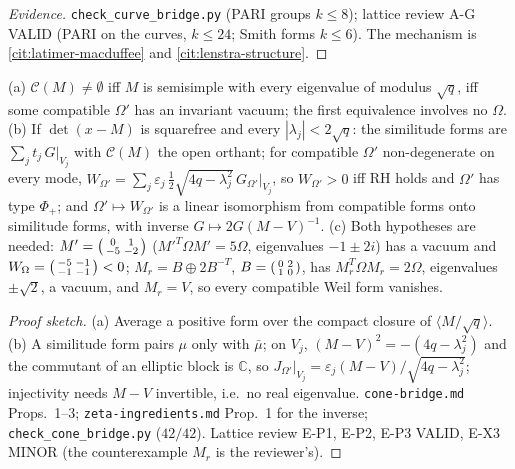 \begin{proof}[Evidence] \texttt{check\_curve\_bridge.py} (PARI groups $k\le8$); lattice review A-G VALID (PARI on the curves, $k\le24$; Smith forms $k\le6$). The mechanism is
\cref{cit:latimer-macduffee} and \cref{cit:lenstra-structure}.
\end{proof}
\begin{proposition}
\label{prop:gkp-vacuum-weil-form-cm-type} 
(a) $\mathcal C(M)\ne\emptyset$ iff $M$ is semisimple with every eigenvalue of modulus $\sqrt q$, iff some compatible $\Omega'$ has an invariant vacuum; the first equivalence %
involves no $\Omega$. (b) If $\det(x-M)$ is squarefree and every $|\lambda_j|<2\sqrt q$: the similitude forms are $\sum_jt_j\,G|_{V_j}$ with $\mathcal C(M)$ the open orthant; for %
compatible $\Omega'$ non-degenerate on every mode, $W_{\Omega'} = \sum_j\varepsilon_j\,\tfrac12\sqrt{4q-\lambda_j^2}\,G_{\Omega'}|_{V_j}$, so $W_{\Omega'}>0$ iff RH holds and %
$\Omega'$ has type $\Phi_+$; and $\Omega'\mapsto W_{\Omega'}$ is a linear isomorphism from compatible forms onto similitude forms, with inverse $G\mapsto2G(M-V)^{-1}$. (c) Both %
hypotheses are needed: $M' = \begin{psmallmatrix}0&1\\-5&-2\end{psmallmatrix}$ ($M'^T\Omega M' = 5\Omega$, eigenvalues $-1\pm2i$) has a vacuum and $W_\Omega = %
\begin{psmallmatrix}-5&-1\\-1&-1\end{psmallmatrix}<0$; $M_r = B\oplus2B^{-T}$, $B =
\begin{psmallmatrix}0&2\\1&0\end{psmallmatrix}$, has $M_r^T\Omega M_r = 2\Omega$, eigenvalues $\pm\sqrt2$, a vacuum, and $M_r = V$, so every compatible Weil form %
vanishes.
\end{proposition}
\begin{proof}[Proof sketch] (a) Average a positive form over the compact closure of $\langle M/\sqrt q\rangle$. (b) A similitude form pairs $\mu$ only with $\bar\mu$; on $V_j$, %
$(M-V)^2 = -(4q-\lambda_j^2)$ and the commutant of an elliptic block is $\mathbb C$, so $J_{\Omega'}|_{V_j} = \varepsilon_j(M-V)/\sqrt{4q-\lambda_j^2}$; injectivity needs $M-V$ %
invertible, i.e.\ no real eigenvalue. \texttt{cone-bridge.md} Props.~1--3; \texttt{zeta-ingredients.md} Prop.~1 for the inverse; \texttt{check\_cone\_bridge.py} ($42/42$).
Lattice review E-P1, E-P2, E-P3 VALID, E-X3 MINOR (the counterexample $M_r$ is the reviewer's).
\end{proof}
